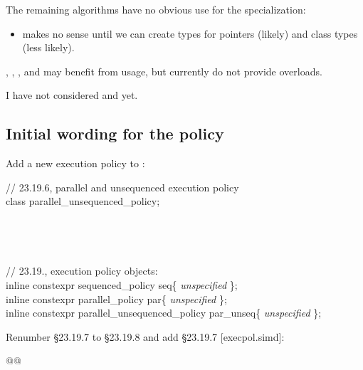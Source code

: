 The remaining algorithms have no obvious use for the specialization:
\begin{itemize}
  \item {} makes no sense until we can create  types for pointers (likely) and class types (less likely).
\end{itemize}

, , , and  may benefit from \simd usage, but currently do not provide  overloads.

I have not considered  and  yet.

\subsection{Initial wording for the policy}

Add a new execution policy to \citep[§23.19.2]{N4659}:
\begin{wgText}
  \begingroup
  \ttfamily
  // 23.19.6, parallel and unsequenced execution policy\\
  class parallel_unsequenced_policy;\\
  \\
  \\
  \\
  \\
  // 23.19., execution policy objects:\\
  inline constexpr sequenced_policy seq\{ \textit{unspecified} \};\\
  inline constexpr parallel_policy par\{ \textit{unspecified} \};\\
  inline constexpr parallel_unsequenced_policy par_unseq\{ \textit{unspecified} \};\\
  \endgroup
\end{wgText}

Renumber §23.19.7 to §23.19.8 and add §23.19.7 [execpol.simd]:
\begin{wgText}
  \begin{itemdecl}
@@
  \end{itemdecl}
  \begin{itemdescr}
    \pnum{}

    \pnum{}
  \end{itemdescr}
\end{wgText}


